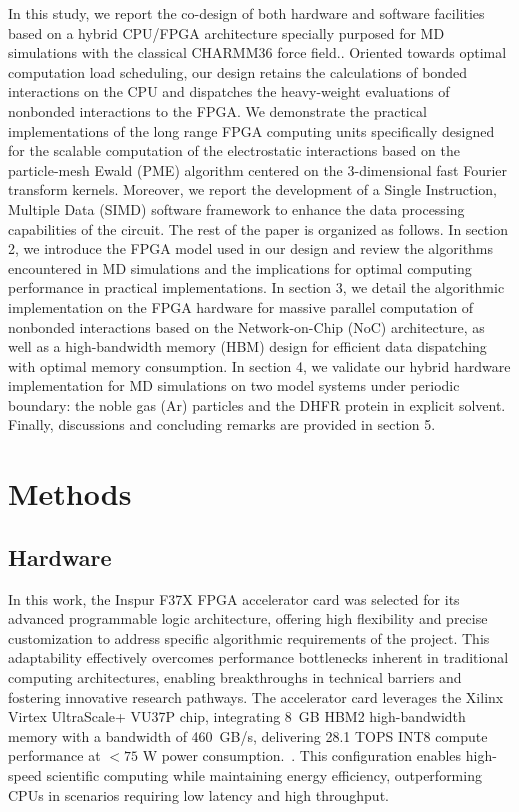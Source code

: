 \documentclass{article}
\begin{document}
\noindent
In this study, we report the co-design of both hardware and software 
facilities based on a hybrid CPU/FPGA architecture specially purposed for MD 
simulations with the classical CHARMM36 force field.\cite{CHARMM36m}. 
Oriented towards optimal computation load scheduling, our design retains the 
calculations of bonded interactions on the CPU and dispatches the heavy-weight 
evaluations of nonbonded interactions to the FPGA.
We demonstrate the practical implementations of the long range FPGA computing 
units specifically designed for the scalable computation of the electrostatic 
interactions based on the particle-mesh Ewald (PME) algorithm centered on the 
3-dimensional fast Fourier transform kernels.
Moreover, we report the development of a Single Instruction, Multiple Data 
(SIMD) software framework to enhance the data processing capabilities of the 
circuit.
The rest of the paper is organized as follows.
In section 2, we introduce the FPGA model used in our design and review the 
algorithms encountered in MD simulations and the implications for optimal 
computing performance in practical implementations.
In section 3, we detail the algorithmic implementation on the FPGA hardware 
for massive parallel computation of nonbonded interactions based on the 
Network-on-Chip (NoC) architecture, as well as a high-bandwidth memory (HBM) 
design for efficient data dispatching with optimal memory consumption.
In section 4, we validate our hybrid hardware implementation for MD simulations 
on two model systems under periodic boundary: the noble gas (Ar) particles and 
the DHFR protein in explicit solvent.
Finally, discussions and concluding remarks are provided in section 5.\\

\section{Methods}
\subsection{Hardware}

In this work, the Inspur F37X FPGA accelerator card was selected for its 
advanced  programmable logic architecture, offering high flexibility and precise 
customization to address specific algorithmic requirements of the project.
This adaptability effectively overcomes performance bottlenecks inherent in 
traditional computing architectures, enabling breakthroughs in technical 
barriers and fostering innovative research pathways.
The accelerator card leverages the Xilinx Virtex UltraScale+ VU37P chip, 
integrating 8~GB HBM2 high-bandwidth memory with a bandwidth of 460~GB/s, 
delivering 28.1 TOPS INT8 compute performance at $<75$ W power 
consumption.~\cite{InspurF37XConferencePaper}.  
This configuration enables high-speed scientific computing 
while maintaining energy efficiency, outperforming CPUs in scenarios requiring 
low latency and high throughput.
\end{document}
